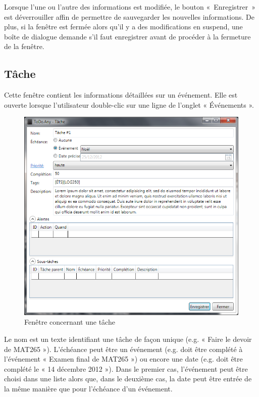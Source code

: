 \documentclass[letterpaper, oneside, 12pt, these, creativecommons]{thETS}
\begin{document}
Lorsque l'une ou l'autre des informations est modifiée, le bouton « Enregistrer » est déverrouiller affin de permettre de sauvegarder les nouvelles informations. De plus, si la fenêtre est fermée alors qu'il y a des modifications en suspend, une boîte de dialogue demande s'il faut enregistrer avant de procéder à la fermeture de la fenêtre.

\subsection{Tâche}

Cette fenêtre contient les informations détaillées sur un événement. Elle est ouverte lorsque l'utilisateur double-clic sur une ligne de l'onglet « Événements ».

\begin{figure}
    \includegraphics[scale=0.7]{fenetre_tache.png}
    \caption{Fenêtre concernant une tâche}
\end{figure}

Le nom est un texte identifiant une tâche de façon unique (e.g. « Faire le devoir de MAT265 »). L'échéance peut être un événement (e.g. doit être complété à l'événement « Examen final de MAT265 ») ou encore une date (e.g. doit être complété le « 14 décembre 2012 »). Dans le premier cas, l'événement peut être choisi dans une liste alors que, dans le deuxième cas, la date peut être entrée de la même manière que pour l'échéance d'un événement.
\end{document}
